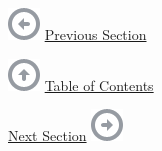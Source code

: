 \hypertarget{navbar-top}{}
\href{s04-00-introduction-to-law-and-legal-.html}{\includegraphics{shared/images/batch-left.png}}
\href{s04-00-introduction-to-law-and-legal-.html}{Previous Section}

\href{index.html}{\includegraphics{shared/images/batch-up.png}}
\href{index.html}{Table of Contents}

\href{s04-02-schools-of-legal-thought.html}{Next Section}
\href{s04-02-schools-of-legal-thought.html}{\includegraphics{shared/images/batch-right.png}}

